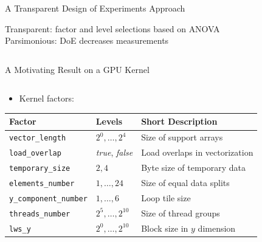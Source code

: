 \documentclass[11pt, compress, aspectratio=169, xcolor={table,usenames,dvipsnames}]{beamer}
\begin{document}
\begin{frame}
\begin{columns}
\begin{column}{0.89\columnwidth}
\begin{columns}
\begin{column}[t]{0.48\columnwidth}
\begin{block}{A Transparent Design of Experiments Approach}
\begin{center}
\vspace{1em}
{\normalsize
\alert{Transparent}:  {\small \alert{factor} and \alert{level} selections based on \alert{ANOVA}  \\[0.5em]}
\alert{Parsimonious}:  {\small DoE \alert{decreases measurements}  }
}
\end{center}
\end{block}
\end{column}
\end{columns}
\begin{columns}
\begin{column}[t]{0.48\columnwidth}
\begin{block}{A Motivating Result on a GPU Kernel}
\begin{columns}
\begin{column}{0.49\columnwidth}
\begin{itemize}
\item Kernel \alert{factors}:
\end{itemize}
\vspace{0.6em}
\begin{table}[htbp]
\centering
\tiny
\begin{tabular}{llp{}}
\toprule
Factor & Levels & Short Description\\
\midrule
\texttt{vector\_length} & \(2^0,\dots,2^4\) & Size of support arrays\\
\texttt{load\_overlap} & \textit{true}, \textit{false} & Load overlaps in vectorization\\
\texttt{temporary\_size} & \(2,4\) & Byte size of temporary data\\
\texttt{elements\_number} & \(1,\dots,24\) & Size of equal data splits\\
\texttt{y\_component\_number} & \(1,\dots,6\) & Loop tile size\\
\texttt{threads\_number} & \(2^5,\dots,2^{10}\) & Size of thread groups\\
\texttt{lws\_y} & \(2^0,\dots,2^{10}\) & Block size in \(y\) dimension\\
\bottomrule
\end{tabular}
\end{table}
\end{column}


\end{columns}
\end{block}
\end{column}
\end{columns}
\end{column}
\end{columns}
\end{frame}
\end{document}
